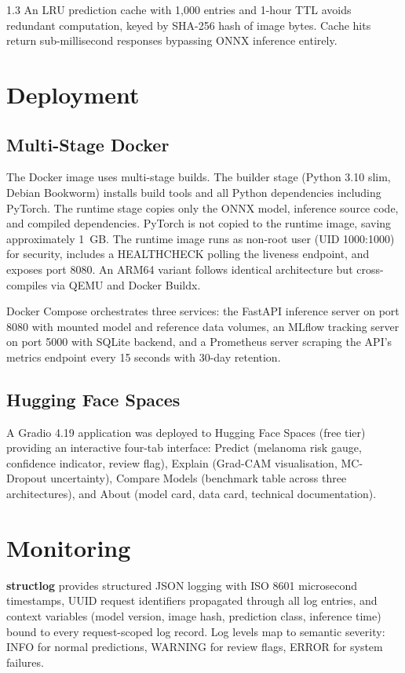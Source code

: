 \begin{spacing}{1.3}
An LRU prediction cache with 1,000 entries and 1-hour TTL avoids redundant computation, keyed by SHA-256 hash of image bytes. Cache hits return sub-millisecond responses bypassing ONNX inference entirely.

\section{Deployment}

\subsection{Multi-Stage Docker}

The Docker image uses multi-stage builds. The builder stage (Python 3.10 slim, Debian Bookworm) installs build tools and all Python dependencies including PyTorch. The runtime stage copies only the ONNX model, inference source code, and compiled dependencies. PyTorch is not copied to the runtime image, saving approximately 1~GB. The runtime image runs as non-root user (UID 1000:1000) for security, includes a HEALTHCHECK polling the liveness endpoint, and exposes port 8080. An ARM64 variant follows identical architecture but cross-compiles via QEMU and Docker Buildx.

Docker Compose orchestrates three services: the FastAPI inference server on port 8080 with mounted model and reference data volumes, an MLflow tracking server on port 5000 with SQLite backend, and a Prometheus server scraping the API's metrics endpoint every 15 seconds with 30-day retention.

\subsection{Hugging Face Spaces}

A Gradio 4.19 application was deployed to Hugging Face Spaces (free tier) providing an interactive four-tab interface: Predict (melanoma risk gauge, confidence indicator, review flag), Explain (Grad-CAM visualisation, MC-Dropout uncertainty), Compare Models (benchmark table across three architectures), and About (model card, data card, technical documentation).

\section{Monitoring}

\textbf{structlog} provides structured JSON logging with ISO 8601 microsecond timestamps, UUID request identifiers propagated through all log entries, and context variables (model version, image hash, prediction class, inference time) bound to every request-scoped log record. Log levels map to semantic severity: INFO for normal predictions, WARNING for review flags, ERROR for system failures.


\end{spacing}
